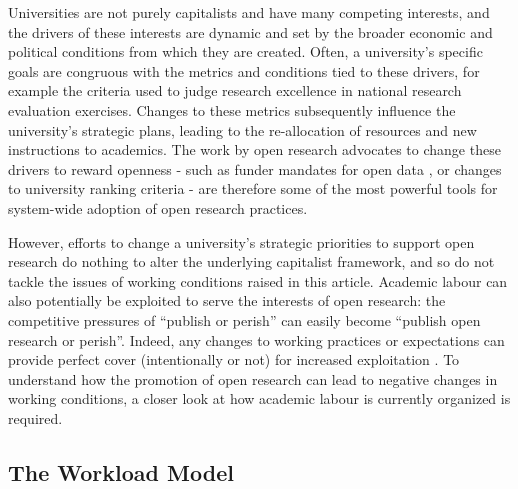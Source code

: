\documentclass[meta, authordate]{jote-new-article}
\begin{document}
Universities are not purely capitalists and have many competing interests, and the drivers of these interests are dynamic and set by the broader economic and political conditions from which they are created. Often, a university’s specific goals are congruous with the metrics and conditions tied to these drivers, for example the criteria used to judge research excellence in national research evaluation exercises. Changes to these metrics subsequently influence the university’s strategic plans, leading to the re-allocation of resources and new instructions to academics. The work by open research advocates to change these drivers to reward openness - such as funder mandates for open data \parencites{Hefce2016}, or changes to university ranking criteria \parencites{Pagliaro2021} - are therefore some of the most powerful tools for system-wide adoption of open research practices.



However, efforts to change a university’s strategic priorities to support open research do nothing to alter the underlying capitalist framework, and so do not tackle the issues of working conditions raised in this article. Academic labour can also potentially be exploited to serve the interests of open research: the competitive pressures of “publish or perish” can easily become “publish open research or perish”. Indeed, any changes to working practices or expectations can provide perfect cover (intentionally or not) for increased exploitation \parencites{Hostler2022}. To understand how the promotion of open research can lead to negative changes in working conditions, a closer look at how academic labour is currently organized is required.



\subsection{The Workload Model}
\end{document}
